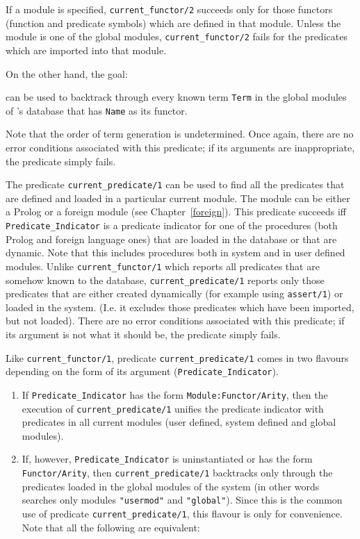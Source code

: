 \begin{description}
    If a module is specified, {\tt current\_functor/2} succeeds only for
    those functors (function and predicate symbols) which are defined in 
    that module. Unless the module is one of the global modules, 
    {\tt current\_functor/2} fails for the predicates which are imported 
    into that module.

    On the other hand, the goal:


    can be used to backtrack through every known term {\tt Term} in the global
    modules of \ourprolog's database that has {\tt Name} as its functor.

    Note that the order of term generation is undetermined. Once again, 
    there are no error conditions associated with this predicate; if its
    arguments are inappropriate, the predicate simply fails.

    The predicate {\tt current\_predicate/1} can be used to find all
    the predicates that are defined and loaded in a particular current module. 
    The module can be either a Prolog or a foreign module (see 
    Chapter~\ref{foreign}).
    This predicate succeeds iff {\tt Predicate\_Indicator} is a 
    predicate indicator for one of the procedures (both Prolog and foreign 
    language ones) that are loaded in the database or that are dynamic. Note
    that this includes procedures both in system and in user defined modules. 
    Unlike {\tt current\_functor/1} which reports all predicates that are
    somehow known to the database, {\tt current\_predicate/1} reports only
    those predicates that are either created dynamically (for example using 
    {\tt assert/1}) or loaded in the system.  (I.e. it excludes those
    predicates which have been imported, but not loaded).
    There are no error conditions associated with this predicate; if its 
    argument is not what it should be, the predicate simply fails.

    Like {\tt current\_functor/1}, predicate {\tt current\_predicate/1}
    comes in two flavours depending on  the form of its argument 
    ({\tt Predicate\_Indicator}).
    \begin{enumerate}
    \item If {\tt Predicate\_Indicator} has the form 
	  {\tt Module:Functor/Arity}, then the execution of
	  {\tt current\_predicate/1} unifies the predicate indicator
	  with predicates in all current modules (user defined, system
	  defined and global modules). 
    \item If, however, {\tt Predicate\_Indicator} is uninstantiated 
	  or has the form {\tt Functor/Arity}, then {\tt current\_predicate/1} 
	  backtracks only through the predicates loaded in the global modules 
	  of the system (in other words searches only modules {\tt "usermod"}
	  and {\tt "global"}).
	  Since this is the common use of predicate {\tt current\_predicate/1}, 
	  this flavour is only for convenience.
	  Note that all the following are equivalent:


\end{enumerate}
\end{description}

